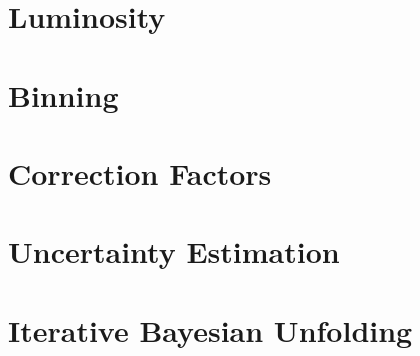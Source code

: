 \section{Luminosity}\label{sec:luminosity}
    
    \clearpage
    
\section{Binning}\label{sec:Ch4_binning}
    
    \clearpage
    
\section{Correction Factors}\label{sec:Ch4_corr_factors}
    
    \clearpage
    
\section{Uncertainty Estimation}\label{sec:uncertainty_analysis}
    
    \clearpage
    
\section{Iterative Bayesian Unfolding}\label{sec:Ch4_IBU}
    
    \clearpage

\iffalse

For each kinematic bin the differential cross section can be written as:

\begin{equation}
    \sigma = \frac{N_{meas}}{L \epsilon}\frac{1}{\delta}
\end{equation}

Where $\frac{N_{meas}}{L}$ is the number of events from experiment normalized by the integrated luminosity before acceptance and radiatvie corrections. $\epsilon$ = $\frac{N^{RAD}_{rec}}{{N^{RAD}_{gen}}}$ is the acceptance correction and $\delta$ is the radiative correction.



$\delta$ can be obtained by using the following:

\begin{equation}
    \delta = \frac{N^{RAD}_{gen}}{N^{NORAD}_{gen}}
\end{equation}

$\delta$ and $\epsilon$ need to be properly calculated, but for a first pass we will ignore them so we have just
\fi




